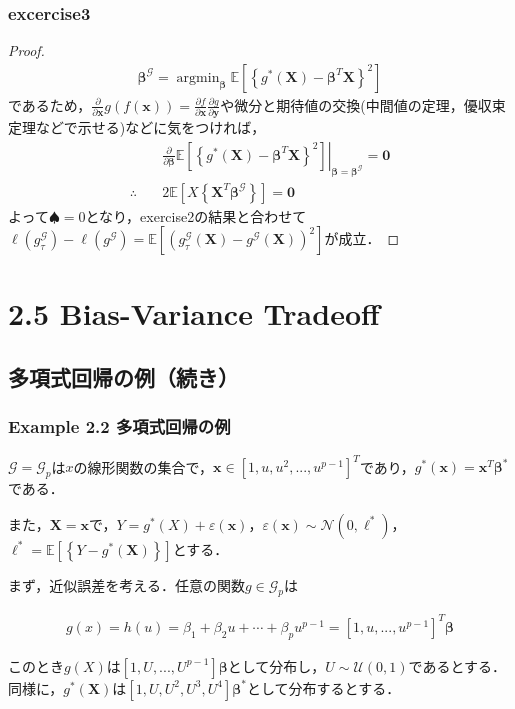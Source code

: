 \documentclass[dvipdfmx,cjk]{beamer}
\theoremstyle{example}
\DeclareMathOperator{\argmin}{argmin}
\begin{document}
\begin{frame}
    \frametitle{excercise3}
    \begin{proof}
        \begin{align*}
            \boldsymbol{\beta}^\mathcal{G}=\argmin_{\boldsymbol{\beta}}\mathbb{E}\left[\left\{g^*(\boldsymbol{X})-\boldsymbol{\beta}^T\boldsymbol{X}\right\}^2\right]
        \end{align*}
        であるため，$\frac{\partial}{\partial\boldsymbol{x}}g(f(\boldsymbol{x}))=\frac{\partial f}{\partial \boldsymbol{x}}\frac{\partial g}{\partial\boldsymbol{y}}$や微分と期待値の交換(中間値の定理，優収束定理などで示せる)などに気をつければ，
        \begin{align*}
                            & \left.\frac{\partial}{\partial\boldsymbol{\beta}}\mathbb{E}\left[\left\{g^*(\boldsymbol{X})-\boldsymbol{\beta}^T\boldsymbol{X}\right\}^2\right]\right|_{\boldsymbol{\beta}=\boldsymbol{\beta}^\mathcal{G}}=\boldsymbol{0} \\
            \therefore\quad & 2\mathbb{E}\left[X\left\{\boldsymbol{X}^T\boldsymbol{\beta}^\mathcal{G}\right\}\right]=\boldsymbol{0}
        \end{align*}
        よって$\spadesuit=0$となり，exercise2の結果と合わせて$\ell(g^\mathcal{G}_\tau)-\ell(g^\mathcal{G})=\mathbb{E}\left[(g^\mathcal{G}_\tau(\boldsymbol{X})-g^\mathcal{G}(\boldsymbol{X}))^2\right]$が成立．
    \end{proof}

\end{frame}


\section{2.5 Bias-Variance Tradeoff}

\subsection{多項式回帰の例（続き）}
\begin{frame}
    \frametitle{Example 2.2 多項式回帰の例}
    $\mathcal{G} = \mathcal{G}_p$は$x$の線形関数の集合で，$\boldsymbol{x} \in [1, u, u^2, ..., u^{p-1}]^T$であり，$g^*(\boldsymbol{x}) = \boldsymbol{x}^T\boldsymbol{\beta}^*$である．

    また，$\boldsymbol{X}=\boldsymbol{x}$で，$Y = g^*(X) + \varepsilon(\boldsymbol{x})$，$\varepsilon(\boldsymbol{x}) \sim \mathcal{N}(0, \ell^*)$，$\ell^* = \mathbb{E}\left[\left\{Y-g^*(\boldsymbol{X})\right\}\right]$とする．

    まず，近似誤差を考える．任意の関数$g \in \mathcal{G}_p$は

    \begin{align*}
        g(x) = h(u) = \beta_1 + \beta_2 u + \cdots + \beta_p u^{p-1} = [1, u, ..., u^{p-1}]^T \boldsymbol{\beta}
    \end{align*}

    このとき$g(X)$は$[1, U, ..., U^{p-1}]\boldsymbol{\beta}$として分布し，$U \sim \mathcal{U}(0, 1)$であるとする．同様に，$g^*(\boldsymbol{X})$は$[1, U, U^2,U^3,U^4]\boldsymbol{\beta}^*$として分布するとする．
\end{frame}
\end{document}
